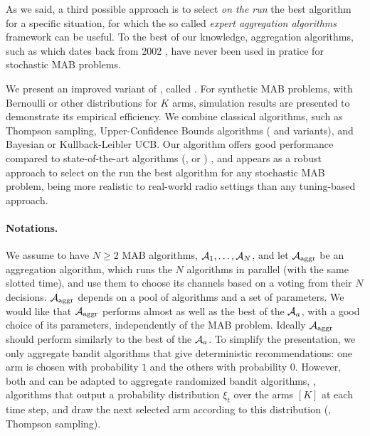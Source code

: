 
As we said, a third possible approach is to select \emph{on the run} the best algorithm for a specific situation, for which the so called \emph{expert aggregation algorithms} framework can be useful.
%
To the best of our knowledge, aggregation algorithms, such as \ExpQ{} which dates back from 2002 \cite{Auer02},
have never been used in pratice for stochastic MAB problems.

We present an improved variant of \ExpQ, called \Aggr.
For synthetic MAB problems, with Bernoulli or other distributions for $K$ arms, simulation results are presented to demonstrate its empirical efficiency.
We combine classical algorithms, such as Thompson sampling, Upper-Confidence Bounds algorithms (\UCB{} and variants), and Bayesian or Kullback-Leibler UCB.
%
Our algorithm offers good performance compared to state-of-the-art algorithms
(\ExpQ{}, \CORRAL{} or \LearnExp{}) \cite{Agarwal16,Singla17},
and appears as a robust approach to select on the run the best algorithm for any stochastic MAB problem, being more realistic to real-world radio settings than any tuning-based approach.



\paragraph{Notations.}\label{sub:25:aggregation}

We assume to have $N \geq 2$ MAB algorithms, $\mathcal{A}_1, \dots, \mathcal{A}_N$,
and let $\mathcal{A}_{\mathrm{aggr}}$ be an aggregation algorithm,
which runs the $N$ algorithms in parallel (with the same slotted time), and use them to choose its channels based on a voting from their $N$ decisions.
%
$\mathcal{A}_{\mathrm{aggr}}$ depends on a pool of algorithms and a set of parameters.
We would like that $\mathcal{A}_{\mathrm{aggr}}$
performs almost as well as the best of the $\mathcal{A}_a$, with a good choice of its parameters, independently of the MAB problem.
Ideally $\mathcal{A}_{\mathrm{aggr}}$ should perform similarly to the best of the $\mathcal{A}_a$.
%
To simplify the presentation, we only aggregate bandit algorithms that give deterministic recommendations:
one arm is chosen with probability $1$ and the others with probability $0$.
However, both \ExpQ{} and \Aggr{} can be adapted to aggregate randomized bandit algorithms, \ie, algorithms that output a probability distribution $\xi_t$ over the arms $[K]$ at each time step, and draw the next selected arm according to this distribution
(\eg, Thompson sampling).

